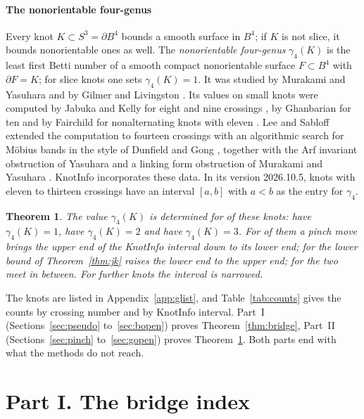 \documentclass[11pt]{amsart}
\newtheorem{theorem}{Theorem}[section]
\theoremstyle{definition}
\theoremstyle{remark}
\numberwithin{equation}{section}
\begin{document}
\subsection*{The nonorientable four-genus}
Every knot $K\subset S^3=\partial B^4$ bounds a smooth surface in $B^4$; if $K$ is not
slice, it bounds nonorientable ones as well. The \emph{nonorientable four-genus}
$\gamma_4(K)$ is the least first Betti number of a smooth compact nonorientable surface
$F\subset B^4$ with $\partial F=K$; for slice knots one sets $\gamma_4(K)=1$. It was studied
by Murakami and Yasuhara \cite{MY} and by Gilmer and Livingston \cite{GiL}. Its values on
small knots were computed by Jabuka and Kelly for eight and nine crossings \cite{JK}, by
Ghanbarian for ten \cite{Gh} and by Fairchild for nonalternating knots with eleven
\cite{Fa}. Lee and Sabloff \cite{LS} extended the computation to fourteen crossings with an
algorithmic search for M\"obius bands in the style of Dunfield and Gong \cite{DG}, together
with the Arf invariant obstruction of Yasuhara \cite{Ya} and a linking form obstruction of
Murakami and Yasuhara \cite{MY}. KnotInfo incorporates these data. In its version
2026.10.5, \ntotal{} knots with eleven to thirteen crossings have an interval $[a,b]$ with
$a<b$ as the entry for $\gamma_4$.

\begin{theorem}\label{thm:gamma}
The value $\gamma_4(K)$ is determined for \nsettled{} of these knots: \nsettledone{} have
$\gamma_4(K)=1$, \nsettledtwo{} have $\gamma_4(K)=2$ and \nsettledthree{} have
$\gamma_4(K)=3$. For \nsettledpinch{} of them a pinch move brings the upper end of the
KnotInfo interval down to its lower end; for \nsettledlower{} the lower bound of
Theorem~\ref{thm:jk} raises the lower end to the upper end; for \nsettledboth{} the two
meet in between. For \nnarrowed{} further knots the interval is narrowed.
\end{theorem}

The knots are listed in Appendix~\ref{app:glist}, and Table~\ref{tab:counts} gives the
counts by crossing number and by KnotInfo interval. Part~I (Sections~\ref{sec:pseudo}
to~\ref{sec:bopen}) proves Theorem~\ref{thm:bridge}, Part~II (Sections~\ref{sec:pinch}
to~\ref{sec:gopen}) proves Theorem~\ref{thm:gamma}. Both parts end with what the methods do
not reach.

\part*{Part I. The bridge index}
\end{document}
